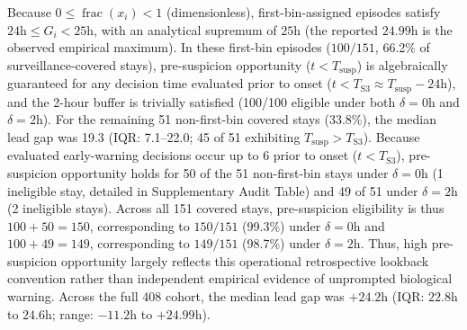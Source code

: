 \documentclass[12pt,a4paper]{article}
\begin{document}
Because $0 \le \operatorname{frac}(x_i) < 1$ (dimensionless), first-bin-assigned episodes satisfy $24\text{h} \le G_i < 25\text{h}$, with an analytical supremum of $25\text{h}$ (the reported $24.99\text{h}$ is the observed empirical maximum). In these first-bin episodes ($100/151$, 66.2\% of surveillance-covered stays), pre-suspicion opportunity ($t < T_{\mathrm{susp}}$) is algebraically guaranteed for any decision time evaluated prior to onset ($t < T_{\mathrm{S3}} \approx T_{\mathrm{susp}} - 24\text{h}$), and the 2-hour buffer is trivially satisfied (100/100 eligible under both $\delta=0\mathrm{h}$ and $\delta=2\mathrm{h}$). For the remaining 51 non-first-bin covered stays (33.8\%), the median lead gap was 19.3 (IQR: 7.1--22.0; 45 of 51 exhibiting $T_{\mathrm{susp}} > T_{\mathrm{S3}}$). Because evaluated early-warning decisions occur up to 6 prior to onset ($t < T_{\mathrm{S3}}$), pre-suspicion opportunity holds for 50 of the 51 non-first-bin stays under $\delta=0\mathrm{h}$ (1 ineligible stay, detailed in Supplementary Audit Table) and 49 of 51 under $\delta=2\mathrm{h}$ (2 ineligible stays). Across all 151 covered stays, pre-suspicion eligibility is thus $100 + 50 = 150$, corresponding to $150/151$ (99.3\%) under $\delta=0\mathrm{h}$ and $100 + 49 = 149$, corresponding to $149/151$ (98.7\%) under $\delta=2\mathrm{h}$. Thus, high pre-suspicion opportunity largely reflects this operational retrospective lookback convention rather than independent empirical evidence of unprompted biological warning. Across the full 408 cohort, the median lead gap was $+24.2\text{h}$ (IQR: $22.8\text{h}$ to $24.6\text{h}$; range: $-11.2\text{h}$ to $+24.99\text{h}$).
\end{document}

